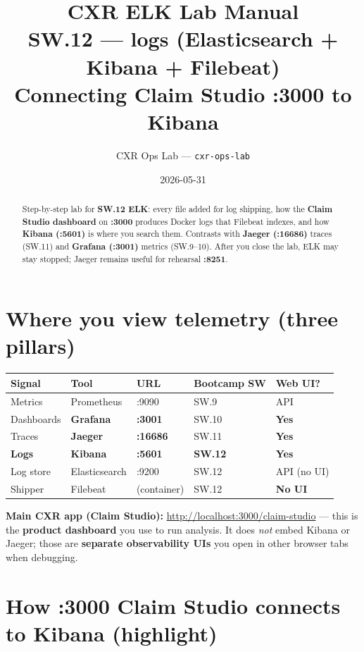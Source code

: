 \documentclass[11pt,a4paper]{report}
\title{CXR ELK Lab Manual\\
\large SW.12 --- logs (Elasticsearch + Kibana + Filebeat)\\
\large Connecting Claim Studio :3000 to Kibana}
\author{CXR Ops Lab --- \texttt{cxr-ops-lab}}
\date{2026-05-31}
\begin{document}
\maketitle
\begin{abstract}
Step-by-step lab for \textbf{SW.12 ELK}: every file added for log shipping, how the
\textbf{Claim Studio dashboard} on \textbf{:3000} produces Docker logs that Filebeat indexes,
and how \textbf{Kibana (:5601)} is where you search them. Contrasts with \textbf{Jaeger (:16686)} traces (SW.11)
and \textbf{Grafana (:3001)} metrics (SW.9--10). After you close the lab, ELK may stay stopped;
Jaeger remains useful for rehearsal \textbf{:8251}.
\end{abstract}
\tableofcontents
\newpage

\chapter{Where you view telemetry (three pillars)}

\begin{center}
\begin{tabular}{lllll}
\toprule
Signal & Tool & URL & Bootcamp SW & Web UI? \\
\midrule
Metrics & Prometheus & :9090 & SW.9 & API \\
Dashboards & \textbf{Grafana} & \textbf{:3001} & SW.10 & \textbf{Yes} \\
Traces & \textbf{Jaeger} & \textbf{:16686} & SW.11 & \textbf{Yes} \\
\textbf{Logs} & \textbf{Kibana} & \textbf{:5601} & \textbf{SW.12} & \textbf{Yes} \\
Log store & Elasticsearch & :9200 & SW.12 & API (no UI) \\
Shipper & Filebeat & (container) & SW.12 & \textbf{No UI} \\
\bottomrule
\end{tabular}
\end{center}

\noindent\textbf{Main CXR app (Claim Studio):} \url{http://localhost:3000/claim-studio} --- this is the
\textbf{product dashboard} you use to run analysis. It does \emph{not} embed Kibana or Jaeger; those are
\textbf{separate observability UIs} you open in other browser tabs when debugging.

\chapter{How :3000 Claim Studio connects to Kibana (highlight)}
\end{document}

